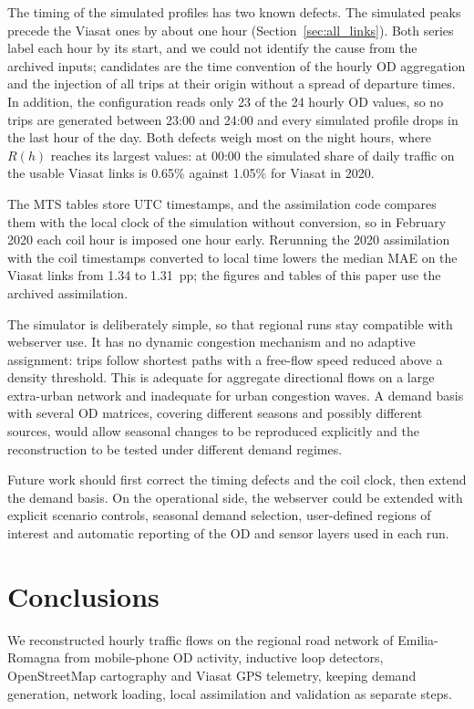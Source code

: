 \documentclass[pdflatex,Numbered]{sn-jnl}
\begin{document}
The timing of the simulated profiles has two known defects. The simulated peaks precede the Viasat ones by about one hour (Section~\ref{sec:all_links}). Both series label each hour by its start, and we could not identify the cause from the archived inputs; candidates are the time convention of the hourly OD aggregation and the injection of all trips at their origin without a spread of departure times. In addition, the configuration reads only 23 of the 24 hourly OD values, so no trips are generated between 23:00 and 24:00 and every simulated profile drops in the last hour of the day. Both defects weigh most on the night hours, where $R(h)$ reaches its largest values: at 00:00 the simulated share of daily traffic on the usable Viasat links is 0.65\% against 1.05\% for Viasat in 2020.

The MTS tables store UTC timestamps, and the assimilation code compares them with the local clock of the simulation without conversion, so in February 2020 each coil hour is imposed one hour early. Rerunning the 2020 assimilation with the coil timestamps converted to local time lowers the median MAE on the Viasat links from 1.34 to 1.31~pp; the figures and tables of this paper use the archived assimilation.

The simulator is deliberately simple, so that regional runs stay compatible with webserver use. It has no dynamic congestion mechanism and no adaptive assignment: trips follow shortest paths with a free-flow speed reduced above a density threshold. This is adequate for aggregate directional flows on a large extra-urban network and inadequate for urban congestion waves. A demand basis with several OD matrices, covering different seasons and possibly different sources, would allow seasonal changes to be reproduced explicitly and the reconstruction to be tested under different demand regimes.

Future work should first correct the timing defects and the coil clock, then extend the demand basis. On the operational side, the webserver could be extended with explicit scenario controls, seasonal demand selection, user-defined regions of interest and automatic reporting of the OD and sensor layers used in each run.

\section{Conclusions}

We reconstructed hourly traffic flows on the regional road network of Emilia-Romagna from mobile-phone OD activity, inductive loop detectors, OpenStreetMap cartography and Viasat GPS telemetry, keeping demand generation, network loading, local assimilation and validation as separate steps.
\end{document}
